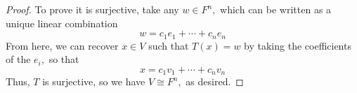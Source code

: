 \documentclass{article}
\begin{document}
\begin{itemize}
\begin{proof}
			To prove it is surjective, take any $w\in F^n,$ which can be written as a unique linear combination
			\[w = c_1e_1+\cdots+c_ne_n\]
			From here, we can recover $x\in V$ such that $T(x)=w$ by taking the coefficients of the $e_i,$ so that
			\[x=c_1v_1+\cdots+c_nv_n\]
			Thus, $T$ is surjective, so we have $V\cong F^n,$ as desired.
		\end{proof}
		
\end{itemize}
\end{document}
